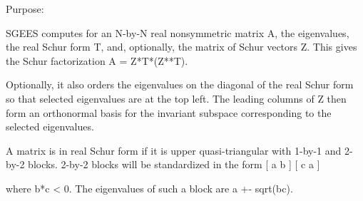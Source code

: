  \begin{DoxyParagraph}{Purpose\+: }
\begin{DoxyVerb} SGEES computes for an N-by-N real nonsymmetric matrix A, the
 eigenvalues, the real Schur form T, and, optionally, the matrix of
 Schur vectors Z.  This gives the Schur factorization A = Z*T*(Z**T).

 Optionally, it also orders the eigenvalues on the diagonal of the
 real Schur form so that selected eigenvalues are at the top left.
 The leading columns of Z then form an orthonormal basis for the
 invariant subspace corresponding to the selected eigenvalues.

 A matrix is in real Schur form if it is upper quasi-triangular with
 1-by-1 and 2-by-2 blocks. 2-by-2 blocks will be standardized in the
 form
         [  a  b  ]
         [  c  a  ]

 where b*c < 0. The eigenvalues of such a block are a +- sqrt(bc).\end{DoxyVerb}
 
\end{DoxyParagraph}

